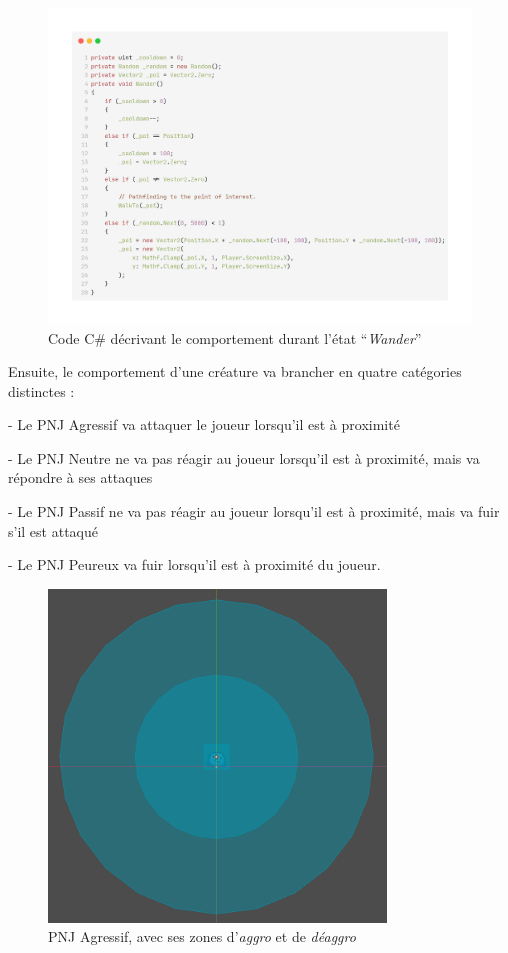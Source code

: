 \begin{figure}[H]
    \centering
    \includegraphics[width=1.0\textwidth]{2.game/assets/gameplay5.png}
    \caption{Code C\# décrivant le comportement durant l'état “\textit{Wander}”}
    \label{fig:gameplay5}
\end{figure}

Ensuite, le comportement d'une créature va brancher en quatre catégories distinctes :

- Le PNJ Agressif va attaquer le joueur lorsqu'il est à proximité

- Le PNJ Neutre ne va pas réagir au joueur lorsqu'il est à proximité, mais va répondre à ses attaques

- Le PNJ Passif ne va pas réagir au joueur lorsqu'il est à proximité, mais va fuir s'il est attaqué

- Le PNJ Peureux va fuir lorsqu'il est à proximité du joueur.
\\

\begin{figure}[H]
    \centering
    \includegraphics[width=0.8\textwidth]{2.game/assets/gameplay6.png}
    \caption{PNJ Agressif, avec ses zones d'\textit{aggro} et de \textit{déaggro}}
    \label{fig:gameplay6}
\end{figure}

